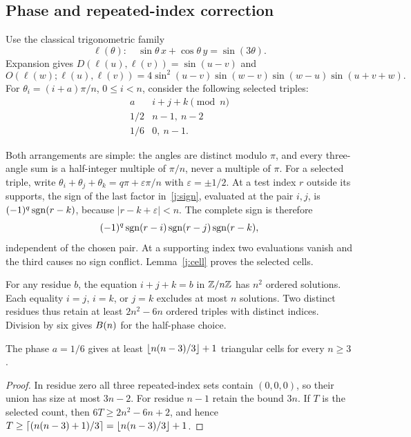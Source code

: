 \subsection{Phase and repeated-index correction}

Use the classical trigonometric family
\begin{equation}\label{j:trig}
 \ell(\theta):\quad \sin\theta\,x+\cos\theta\,y=\sin(3\theta).
\end{equation}
Expansion gives $D(\ell(u),\ell(v))=\sin(u-v)$ and
\begin{equation}\label{j:sign}
 O(\ell(w);\ell(u),\ell(v))
 =4\sin^2(u-v)\sin(w-v)\sin(w-u)\sin(u+v+w).
\end{equation}
For $\theta_i=(i+a)\pi/n$, $0\le i<n$, consider the following selected triples:
\begin{equation}\label{j:residues}
 \begin{array}{c|c}
 a & i+j+k\pmod n\\ \hline
 1/2 & n-1,\ n-2\\
 1/6 & 0,\ n-1 .
 \end{array}
\end{equation}

Both arrangements are simple: the angles are distinct modulo $\pi$, and every three-angle sum is a half-integer multiple of $\pi/n$, never a multiple of $\pi$. For a selected triple, write
$\theta_i+\theta_j+\theta_k=q\pi+\varepsilon\pi/n$ with $\varepsilon=\pm1/2$. At a test index $r$ outside its supports, the sign of the last factor in~\eqref{j:sign}, evaluated at the pair $i,j$, is
$(-1)^q\operatorname{sgn}(r-k)$, because $|r-k+\varepsilon|<n$. The complete sign is therefore
\[
 (-1)^q\operatorname{sgn}(r-i)\operatorname{sgn}(r-j)\operatorname{sgn}(r-k),
\]
independent of the chosen pair. At a supporting index two evaluations vanish and the third causes no sign conflict. Lemma~\ref{j:cell} proves the selected cells.

For any residue $b$, the equation $i+j+k=b$ in $\mathbb Z/n\mathbb Z$ has $n^2$ ordered solutions. Each equality $i=j$, $i=k$, or $j=k$ excludes at most $n$ solutions. Two distinct residues thus retain at least $2n^2-6n$ ordered triples with distinct indices. Division by six gives $B(n)$ for the half-phase choice.

\begin{lemma}\label{j:phase}
The phase $a=1/6$ gives at least $\left\lfloor n(n-3)/3\right\rfloor+1$ triangular cells for every $n\ge3$.
\end{lemma}
\begin{proof}
In residue zero all three repeated-index sets contain $(0,0,0)$, so their union has size at most $3n-2$. For residue $n-1$ retain the bound $3n$. If $T$ is the selected count, then
$6T\ge2n^2-6n+2$, and hence
$T\ge\left\lceil(n(n-3)+1)/3\right\rceil=\left\lfloor n(n-3)/3\right\rfloor+1$.
\end{proof}

